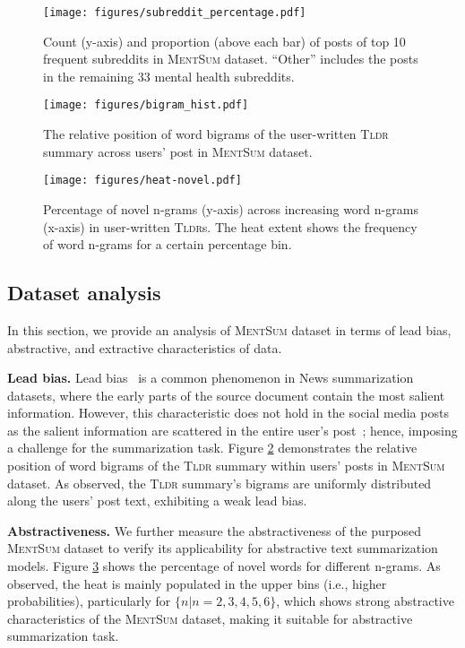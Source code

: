 \documentclass[10pt, a4paper]{article}
\newcommand{\tldr}{\textsc{Tldr}}
\newcommand{\mentsum}{\textsc{MentSum}}
\begin{document}
\begin{figure}
    \centering
    \texttt{[image: figures/subreddit\_percentage.pdf]}
    \caption{Count (y-axis) and proportion (above each bar) of posts of top 10 frequent subreddits  in \mentsum{} dataset. ``Other'' includes the posts in the remaining 33 mental health subreddits. }
    \label{fig:tldr_precentage}
\end{figure}

\begin{figure}
    \centering
    \texttt{[image: figures/bigram\_hist.pdf]}
    \caption{The relative position of word bigrams of the user-written \tldr{} summary across users' post in \mentsum{} dataset.  }
    \label{fig:lead}
\end{figure}

\begin{figure}[t]
    \centering
    \texttt{[image: figures/heat-novel.pdf]}
    \caption{Percentage of novel n-grams (y-axis) across increasing word n-grams (x-axis) in user-written \tldr s. The heat extent shows the frequency of word n-grams for a certain percentage bin.}
    \label{fig:novel}
\end{figure}


\subsection{Dataset analysis}
\label{sec:dataset_analysis}
In this section, we provide an analysis of \mentsum{} dataset in terms of lead bias, abstractive, and extractive characteristics of data.


\textbf{Lead bias. } Lead bias~\cite{Hong2014ImprovingTE} is a common phenomenon in News summarization datasets,
where the early parts of the source document contain the most salient information. However, this characteristic does not hold in the social media posts as the salient information are scattered in the entire user's post~\cite{Kim2019AbstractiveSO}; hence, imposing a challenge for the summarization task. Figure \ref{fig:lead} demonstrates the relative position of word bigrams of the \tldr{} summary within users' posts in \mentsum{} dataset. As observed, the \tldr{} summary's bigrams are uniformly distributed along the users' post text, exhibiting a weak lead bias. 

\textbf{Abstractiveness.} We further measure the abstractiveness of the purposed \mentsum{} dataset to verify its applicability for abstractive text summarization models. Figure \ref{fig:novel} shows the percentage of novel words for different n-grams. As observed, the heat is mainly populated in the upper bins (i.e., higher probabilities), particularly for $\{n | n=2, 3, 4, 5, 6\}$, which shows strong abstractive characteristics of the \mentsum{} dataset, making it suitable for abstractive summarization task.  
\end{document}
